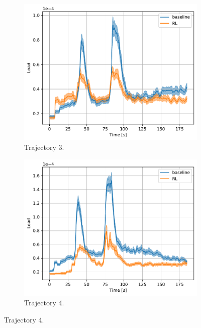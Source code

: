 \documentclass[english, 12pt, a4paper, elec, utf8, a-1b, online]{aaltothesis}
\begin{document}
\begin{figure}[htb]
\begin{subfigure}[b]{0.45\textwidth}
    \end{subfigure}
    \hfill
    \begin{subfigure}[b]{0.45\textwidth}
        \centering
        \includegraphics[width=\linewidth]{figures/benchmark/Simulations/tracking_load_2.pdf}
        \caption{Trajectory 3.}
        \label{fig:TL_T3}
    \end{subfigure}
    \hfill
    \begin{subfigure}[b]{0.45\textwidth}
        \centering
        \includegraphics[width=\linewidth]{figures/benchmark/Simulations/tracking_load_3.pdf}
        \caption{Trajectory 4.}
        \label{fig:TL_T4}
    \end{subfigure}

\end{figure}
\end{document}
